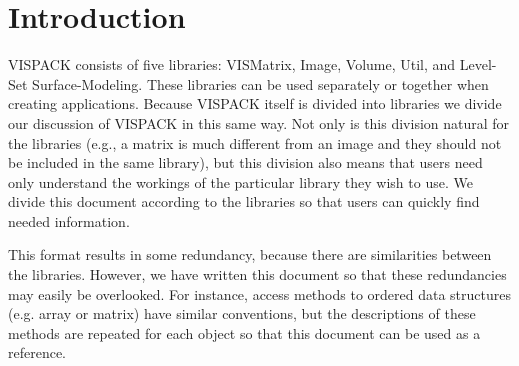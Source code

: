 \section{Introduction}
VISPACK consists of five libraries:  VISMatrix, Image, Volume, Util, and Level-Set
Surface-Modeling.
These libraries can be used separately or together when creating applications.
Because VISPACK itself is divided into libraries we divide our
discussion of VISPACK in this same way.
Not only is this division natural for the libraries
(e.g., a matrix is much different from an image and they should not be
included in the same library), but
this division also means that users need only understand the workings
of the particular library they wish to use.
We divide this document according to the libraries so that users can
quickly find needed information.

This format results in some redundancy, because 
there are similarities between the libraries.   However, we have written 
this document so that these redundancies may easily be overlooked.
For instance, access methods to ordered data structures (e.g. array 
or matrix) have similar conventions, but the descriptions of these 
methods are repeated for each object so that this document can be used 
as a reference.

